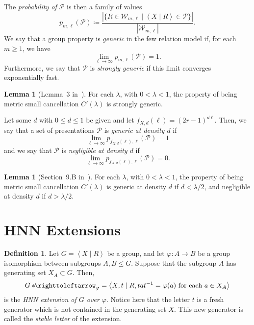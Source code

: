 \documentclass[11pt,a4paper,reqno]{amsart}
\theoremstyle{plain}
\theoremstyle{definition}
\newtheorem{lemma}[theorem]{Lemma}
\newtheorem{definition}[theorem]{Definition}
\theoremstyle{definition}
\renewcommand\leq\leqslant
\newcommand\hnn{*\!\!\righttoleftarrow}
\begin{document}
The \emph{probability of $\mathcal P$} is then a family of values
\[
	p_{m,\ell}(\mathcal P)
	\coloneq
	\frac{|\{ R\in\mathcal W_{m,\ell} \mid \left\langle X\mid R \right\rangle \in \mathcal P  \}|}{| \mathcal W_{m,\ell} |}.
\]
We say that a group property is \emph{generic} in the few relation model if, for each $m \geqslant 1$, we have
\[
	\lim_{\ell \to \infty} p_{m,\ell}(\mathcal{P}) = 1.
\]
Furthermore, we say that $\mathcal{P}$ is \emph{strongly generic} if this limit converges exponentially fast.

\begin{lemma}[Lemma~3 in~\cite{arzhantseva}]
For each $\lambda$, with $0< \lambda<1$, the property of being metric small cancellation $C'(\lambda)$ is strongly generic.
\end{lemma}

Let some $d$ with $0 \leqslant d \leqslant 1$ be given and let $f_{X,d}(\ell) = (2r-1)^{d\ell}$.
Then, we say that a set of presentations $\mathcal{P}$ is \emph{generic at density $d$} if
\[
	\lim_{\ell \to \infty}
	p_{f_{X,d}(\ell),\ell}(\mathcal{P}) = 1
\]
and we say that $\mathcal{P}$ is \emph{negligible at density $d$} if
\[
	\lim_{\ell \to \infty}
	p_{f_{X,d}(\ell),\ell}(\mathcal{P}) = 0.
\]

\begin{lemma}[Section~9.B in~\cite{gromov_asymptotic}]
For each $\lambda$, with $0 < \lambda < 1$, the property of being metric small cancellation $C'(\lambda)$ is generic at density $d$ if $d < \lambda/2$, and negligible at density $d$ if $d > \lambda/2$.
\end{lemma}

\section{HNN Extensions}

\begin{definition}\label{def:hnn-extension}
	Let $G = \left\langle X \mid R\right\rangle$ be a group, and let $\varphi\colon A\to B$ be a group isomorphism between subgroups $A,B\leq G$.
	Suppose that the subgroup $A$ has generating set $X_A \subset G$.
	Then,
	\[
		G\hnn_\varphi
		=
		\left\langle
		X, t
		\mid
		R, tat^{-1} = \varphi(a)\text{ for each } a\in X_A
		\right\rangle
	\]
	is the \emph{HNN extension of $G$ over $\varphi$}.
	Notice here that the letter $t$ is a fresh generator which is not contained in the generating set $X$.
	This new generator is called the \emph{stable letter} of the extension.
\end{definition}
\end{document}
